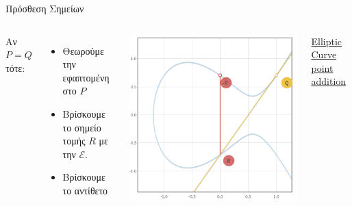 \documentclass[handout]{beamer}
\begin{document}
\begin{frame}[allowframebreaks]{Πρόσθεση Σημείων}
\framebreak
\begin{columns}
Αν $P = Q$ τότε:
\begin{itemize}
\item Θεωρούμε την εφαπτομένη στο $P$
\item Βρίσκουμε το σημείο τομής $R$ με την $\mathcal{E}$.
\item Βρίσκουμε το αντίθετο
\end{itemize}
\begin{center}
\includegraphics[scale=0.3]{add_same.png} 
\end{center}
\href{https://cdn.rawgit.com/andreacorbellini/ecc/920b29a/interactive/reals-add.html}{Elliptic Curve point addition}
\end{columns} 

\framebreak


\end{frame}
\end{document}
